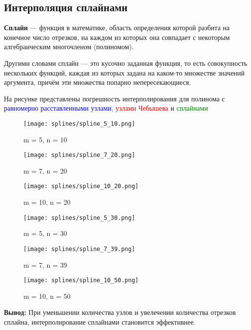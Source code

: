 \subsection{Интерполяция сплайнами}
\textbf{Сплайн} — функция в математике, область определения которой разбита на конечное число отрезков, на каждом из которых она совпадает с некоторым алгебраическим многочленом (полиномом).

Другими словами сплайн — это кусочно заданная функция, то есть совокупность нескольких функций, каждая из которых задана на каком-то множестве значений аргумента, причём эти множества попарно непересекающиеся.


На рисунке представлены погрешность интерполирования для полинома с \textcolor{blue}{равномерно расставленными узлами}, \textcolor{red}{узлами Чебышева} и \textcolor{green}{сплайнами}
\begin{figure}[H]
    \centering
        \texttt{[image: splines/spline\_5\_10.png]}
        \caption*{m = 5, n = 10}
    \endminipage\hfill
        \texttt{[image: splines/spline\_7\_20.png]}
        \caption*{m = 7, n = 20}
    \endminipage\hfill
        \texttt{[image: splines/spline\_10\_20.png]}
        \caption*{m = 10, n = 20}
    \endminipage\hfill
        \texttt{[image: splines/spline\_5\_30.png]}
        \caption*{m = 5, n = 30}
    \endminipage\hfill
        \texttt{[image: splines/spline\_7\_39.png]}
        \caption*{m = 7, n = 39}
    \endminipage\hfill
        \texttt{[image: splines/spline\_10\_50.png]}
        \caption*{m = 10, n = 50}
    \endminipage\hfill
\end{figure}
\textbf{Вывод:} При уменьшении количества узлов и увелечении количества отрезков сплайна, интерполирование сплайнами становится эффективнее.

